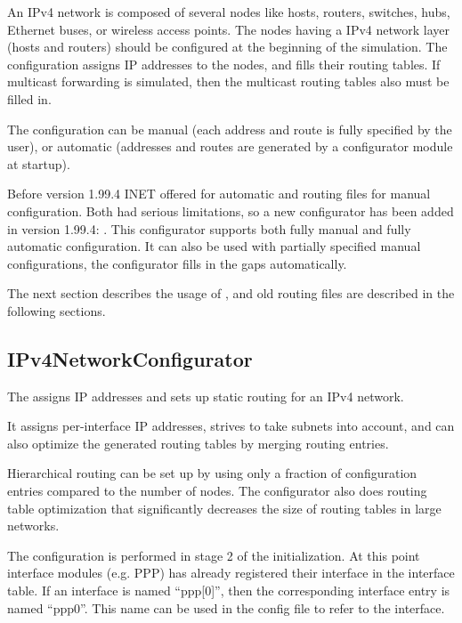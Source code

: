 An IPv4 network is composed of several nodes like hosts, routers,
switches, hubs, Ethernet buses, or wireless access points.
The nodes having a IPv4 network layer (hosts and routers) should be
configured at the beginning of the simulation. The configuration
assigns IP addresses to the nodes, and fills their routing tables.
If multicast forwarding is simulated, then the multicast routing
tables also must be filled in.


The configuration can be manual (each address and route is fully specified
by the user), or automatic (addresses and routes are generated by
a configurator module at startup).

Before version 1.99.4 INET offered 
for automatic and routing files for manual configuration.
Both had serious limitations, so a new configurator has been added
in version 1.99.4: . This configurator
supports both fully manual and fully automatic configuration. It
can also be used with partially specified manual configurations,
the configurator fills in the gaps automatically. 

The next section describes the usage of ,
 and old routing files are described
in the following sections. 

\subsection{IPv4NetworkConfigurator}
\label{subsec:ipv4configurator}

The  assigns IP addresses and sets up
static routing for an IPv4 network.

It assigns per-interface IP addresses, strives to take subnets into account,
and can also optimize the generated routing tables by merging routing entries.

Hierarchical routing can be set up by using only a fraction of configuration
entries compared to the number of nodes. The configurator also does
routing table optimization that significantly decreases the size of routing
tables in large networks.

The configuration is performed in stage 2 of the initialization. At this
point interface modules (e.g. PPP) has already registered their interface
in the interface table. If an interface is named ``ppp[0]'', then the
corresponding interface entry is named ``ppp0''. This name can be used
in the config file to refer to the interface.


